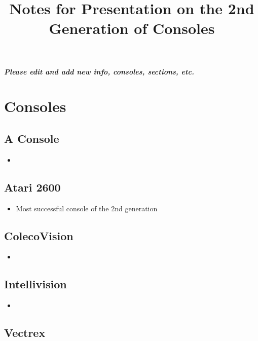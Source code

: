 \documentclass{article}
\title{Notes for Presentation on the 2nd Generation of Consoles}
\date{}
\begin{document}
\maketitle

\textit{\textbf{Please edit and add new info, consoles, sections, etc.}}


\section*{Consoles}

\subsection*{A Console}
\begin{itemize}

\item %

\end{itemize}

\subsection*{Atari 2600}
\begin{itemize}

\item Most successful console of the 2nd generation

\end{itemize}


\subsection*{ColecoVision}
\begin{itemize}

\item %

\end{itemize}


\subsection*{Intellivision}
\begin{itemize}

\item %

\end{itemize}


\subsection*{Vectrex}
\end{document}
